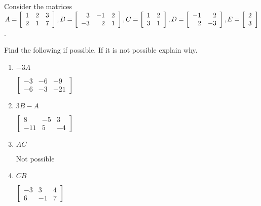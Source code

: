 \documentclass{ximera}
\begin{document}
\begin{problem}\label{prb:4.9} Consider the matrices $
A =\left[
\begin{array}{rrr}
1 & 2 & 3 \\
2 & 1 & 7
\end{array}
\right],  B=\left[
\begin{array}{rrr}
3 & -1 & 2 \\
-3 & 2 & 1
\end{array}
\right],
C =\left[
\begin{array}{rr}
1 & 2 \\
3 & 1
\end{array}
\right], \\ D=\left[
\begin{array}{rr}
-1 & 2 \\
2 & -3
\end{array}
\right],  E=\left[
\begin{array}{r}
2 \\
3
\end{array}
\right]$.

Find the following if possible. If it is not possible explain why.
\begin{enumerate}
\item $-3A$

\begin{hint}
$\left[
\begin{array}{rrr}
-3 & -6 & -9 \\
-6 & -3 & -21
\end{array}
\right]$
\end{hint}

\item $3B-A$

\begin{hint}
$\left[
\begin{array}{rrr}
8 & -5 & 3 \\
-11 & 5 & -4
\end{array}
\right]$
\end{hint}

\item $AC$

\begin{hint}
Not possible
\end{hint}

\item $CB$

\begin{hint}
$\left[
\begin{array}{rrr}
-3 & 3 & 4 \\
6 & -1 & 7
\end{array}
\right]$
\end{hint}


\end{enumerate}
\end{problem}
\end{document}
